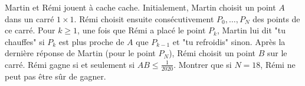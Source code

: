 Martin et Rémi jouent à cache cache. Initialement, Martin choisit un point $A$ dans un carré $1\times 1$. Rémi choisit ensuite consécutivement $P_0, \dots, P_N$ des points de ce carré. Pour $k\ge 1$, une fois que Rémi a placé le point $P_k$, Martin lui dit "tu chauffes" si $P_k$ est plus proche de $A$ que $P_{k - 1}$ et "tu refroidis" sinon. Après la dernière réponse de Martin (pour le point $P_N$), Rémi choisit un point $B$ sur le carré. Rémi gagne si et seulement si $AB\le \frac1{2020}$. Montrer que si $N=18$, Rémi ne peut pas être sûr de gagner.